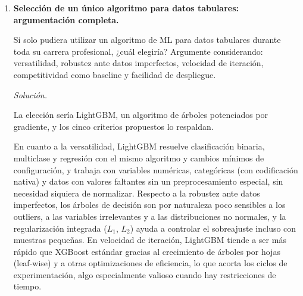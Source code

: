 \documentclass[12pt]{article}
\newcommand\sol[1]{\begin{mdframed}
\emph{Solución.} #1
\end{mdframed}}
\begin{document}
\begin{enumerate}
{\medskip
Las limitaciones más relevantes proceden de la naturaleza de los datos. El ruido de alta frecuencia
es elevado, y aunque la reducción dimensional ayuda, no lo elimina, de modo que las ventanas
temporales deben ser lo bastante largas para suavizarlo sin perder la información de los cambios de
régimen. Los outliers son inevitables, pues las crisis son por definición observaciones atípicas que
pueden dominar el PCA, lo que aconseja tratarlos previamente. Las estructuras no esféricas también
suponen un problema: los regímenes no son necesariamente convexos ni esféricos, y mientras K-Means
asume esfericidad, los Gaussian Mixture Models admiten elipses y DBSCAN puede captar formas
arbitrarias a costa de una menor estabilidad. Por último, hay que evitar la fuga de información del
futuro: si los regímenes se definen con el histórico completo y luego se usan como variables
predictivas, se introduce un sesgo, por lo que cualquier estrategia basada en regímenes debe
definirlos usando solo los datos disponibles hasta el momento de la predicción.
}

\item \textbf{Selección de un único algoritmo para datos tabulares: argumentación completa.}

Si solo pudiera utilizar un algoritmo de ML para datos tabulares durante toda su carrera
profesional, ¿cuál elegiría? Argumente considerando: versatilidad, robustez ante datos imperfectos,
velocidad de iteración, competitividad como baseline y facilidad de despliegue.

\sol{

La elección sería LightGBM, un algoritmo de árboles potenciados por gradiente, y los cinco criterios
propuestos lo respaldan.

\medskip
En cuanto a la versatilidad, LightGBM resuelve clasificación binaria, multiclase y regresión con el
mismo algoritmo y cambios mínimos de configuración, y trabaja con variables numéricas, categóricas
(con codificación nativa) y datos con valores faltantes sin un preprocesamiento especial, sin
necesidad siquiera de normalizar. Respecto a la robustez ante datos imperfectos, los árboles de
decisión son por naturaleza poco sensibles a los outliers, a las variables irrelevantes y a las
distribuciones no normales, y la regularización integrada ($L_1$, $L_2$) ayuda a controlar el
sobreajuste incluso con muestras pequeñas. En velocidad de iteración, LightGBM tiende a ser más
rápido que XGBoost estándar gracias al crecimiento de árboles por hojas (leaf-wise) y a otras
optimizaciones de eficiencia, lo que acorta los ciclos de experimentación, algo especialmente valioso
cuando hay restricciones de tiempo.

}
\end{enumerate}
\end{document}
